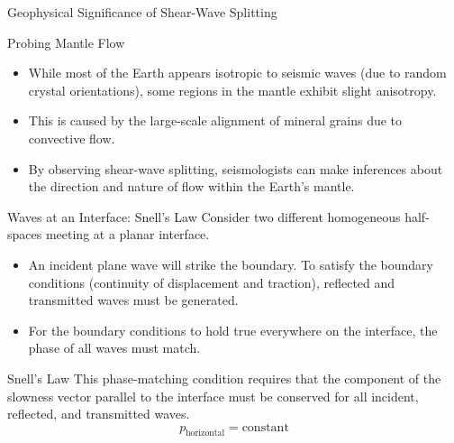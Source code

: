 \documentclass{beamer}
\begin{document}
\begin{frame}{Geophysical Significance of Shear-Wave Splitting}
    \begin{exampleblock}{Probing Mantle Flow}
        \begin{itemize}
            \item While most of the Earth appears isotropic to seismic waves (due to random crystal orientations), some regions in the mantle exhibit slight anisotropy.
            \pause
            \item This is caused by the large-scale alignment of mineral grains due to convective flow.
            \pause
            \item By observing shear-wave splitting, seismologists can make inferences about the direction and nature of flow within the Earth's mantle.
        \end{itemize}
    \end{exampleblock}
\end{frame}


\begin{frame}{Waves at an Interface: Snell's Law}
    Consider two different homogeneous half-spaces meeting at a planar interface.
    \begin{itemize}
        \item An incident plane wave will strike the boundary. To satisfy the boundary conditions (continuity of displacement and traction), reflected and transmitted waves must be generated.
        \pause
        \item For the boundary conditions to hold true everywhere on the interface, the phase of all waves must match.
    \end{itemize}
    \pause
    \begin{alertblock}{Snell's Law}
        This phase-matching condition requires that the component of the slowness vector parallel to the interface must be conserved for all incident, reflected, and transmitted waves.
        $$ p_{\text{horizontal}} = \text{constant} $$
    \end{alertblock}
\end{frame}
\end{document}
